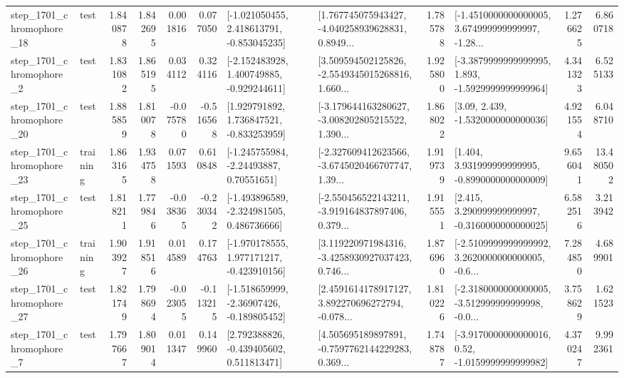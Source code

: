 \begin{tabular}{llrrrrllrlrr}
 step\_1701\_chromophore\_18 &      test &      1.840878 &    1.842695 &      0.001816 &  0.077050 &   [-1.021050455, 2.418613791, -0.853045235] &  [1.767745075943427, -4.040258939628831, 0.8949... &       1.785788 &  [-1.4510000000000005, 3.674999999999997, -1.28... &            1.276625 &          6.860718 \\
  step\_1701\_chromophore\_2 &      test &      1.831082 &    1.865195 &      0.034112 &  0.324116 &   [-2.152483928, 1.400749885, -0.929244611] &  [3.509594502125826, -2.5549345015268816, 1.660... &       1.925800 &  [-3.3879999999999995, 1.893, -1.5929999999999964] &            4.341323 &          6.525133 \\
 step\_1701\_chromophore\_20 &      test &      1.885859 &    1.810078 &     -0.075780 & -0.516568 &    [1.929791892, 1.736847521, -0.833253959] &  [-3.179644163280627, -3.008202805215522, 1.390... &       1.868022 &                 [3.09, 2.439, -1.5320000000000036] &            4.921554 &          6.048710 \\
 step\_1701\_chromophore\_23 &  training &      1.863165 &    1.934758 &      0.071593 &  0.610848 &     [-1.245755984, -2.24493887, 0.70551651] &  [-2.327609412623566, -3.6745020466707747, 1.39... &       1.919739 &    [1.404, 3.931999999999995, -0.8990000000000009] &            9.656041 &         13.480502 \\
 step\_1701\_chromophore\_25 &      test &      1.818211 &    1.779846 &     -0.038365 & -0.230342 &   [-1.493896589, -2.324981505, 0.486736666] &  [-2.550456522143211, -3.919164837897406, 0.379... &       1.915551 &    [2.415, 3.290999999999997, -0.3160000000000025] &            6.582516 &          3.213942 \\
 step\_1701\_chromophore\_26 &  training &      1.903927 &    1.918516 &      0.014589 &  0.174763 &   [-1.970178555, 1.977171217, -0.423910156] &  [3.119220971984316, -3.4258930927037423, 0.746... &       1.876960 &  [-2.5109999999999992, 3.2620000000000005, -0.6... &            7.284850 &          4.689901 \\
 step\_1701\_chromophore\_27 &      test &      1.821749 &    1.798694 &     -0.023055 & -0.113215 &   [-1.518659999, -2.36907426, -0.189805452] &  [2.4591614178917127, 3.892270696272794, -0.078... &       1.810226 &  [-2.3180000000000005, -3.512999999999998, -0.0... &            3.758629 &          1.621523 \\
  step\_1701\_chromophore\_7 &      test &      1.797667 &    1.809014 &      0.011347 &  0.149960 &    [2.792388826, -0.439405602, 0.511813471] &  [4.505695189897891, -0.7597762144229283, 0.369... &       1.748787 &   [-3.9170000000000016, 0.52, -1.0159999999999982] &            4.370247 &          9.992361 \\

\end{tabular}
